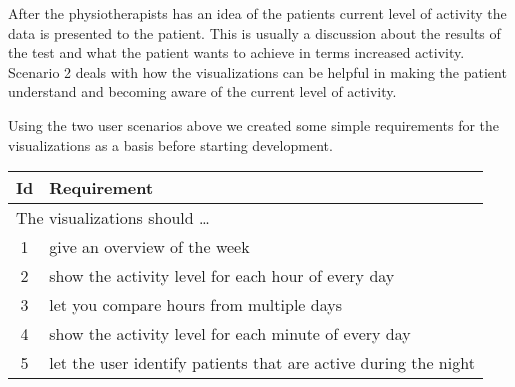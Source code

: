 After the physiotherapists has an idea of the patients current level of activity the data is presented to the patient. This is usually a discussion about the results of the test and what the patient wants to achieve in terms increased activity. Scenario 2 deals with how the visualizations can be helpful in making the patient understand and becoming aware of the current level of activity.

Using the two user scenarios above we created some simple requirements for the visualizations as a basis before starting development.

\begin{table}[h!]
  \begin{center}
  \begin{tabular}{|c|p{12cm}|}
    \hline
      \textbf{Id} & \textbf{Requirement} \\ \hline
    \multicolumn{2}{|l|}{The visualizations should \ldots} \\ \hline
      1 & give an overview of the week \\ \hline
      2 & show the activity level for each hour of every day \\ \hline
      3 & let you compare hours from multiple days \\ \hline
      4 & show the activity level for each minute of every day \\ \hline
      5 & let the user identify patients that are active during the night \\ \hline
  \end{tabular}
  \end{center}
\end{table}
